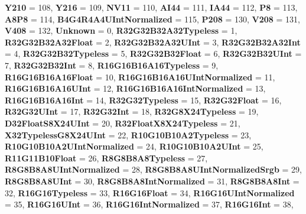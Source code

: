 \begin{DoxyCompactItemize}
{\bfseries Y210} = 108, 
{\bfseries Y216} = 109, 
\newline
{\bfseries N\+V11} = 110, 
{\bfseries A\+I44} = 111, 
{\bfseries I\+A44} = 112, 
{\bfseries P8} = 113, 
\newline
{\bfseries A8\+P8} = 114, 
{\bfseries B4\+G4\+R4\+A4\+U\+Int\+Normalized} = 115, 
{\bfseries P208} = 130, 
{\bfseries V208} = 131, 
\newline
{\bfseries V408} = 132, 
{\bfseries Unknown} = 0, 
{\bfseries R32\+G32\+B32\+A32\+Typeless} = 1, 
{\bfseries R32\+G32\+B32\+A32\+Float} = 2, 
\newline
{\bfseries R32\+G32\+B32\+A32\+U\+Int} = 3, 
{\bfseries R32\+G32\+B32\+A32\+Int} = 4, 
{\bfseries R32\+G32\+B32\+Typeless} = 5, 
{\bfseries R32\+G32\+B32\+Float} = 6, 
\newline
{\bfseries R32\+G32\+B32\+U\+Int} = 7, 
{\bfseries R32\+G32\+B32\+Int} = 8, 
{\bfseries R16\+G16\+B16\+A16\+Typeless} = 9, 
{\bfseries R16\+G16\+B16\+A16\+Float} = 10, 
\newline
{\bfseries R16\+G16\+B16\+A16\+U\+Int\+Normalized} = 11, 
{\bfseries R16\+G16\+B16\+A16\+U\+Int} = 12, 
{\bfseries R16\+G16\+B16\+A16\+Int\+Normalized} = 13, 
{\bfseries R16\+G16\+B16\+A16\+Int} = 14, 
\newline
{\bfseries R32\+G32\+Typeless} = 15, 
{\bfseries R32\+G32\+Float} = 16, 
{\bfseries R32\+G32\+U\+Int} = 17, 
{\bfseries R32\+G32\+Int} = 18, 
\newline
{\bfseries R32\+G8\+X24\+Typeless} = 19, 
{\bfseries D32\+Float\+S8\+X24\+U\+Int} = 20, 
{\bfseries R32\+Float\+X8\+X24\+Typeless} = 21, 
{\bfseries X32\+Typeless\+G8\+X24\+U\+Int} = 22, 
\newline
{\bfseries R10\+G10\+B10\+A2\+Typeless} = 23, 
{\bfseries R10\+G10\+B10\+A2\+U\+Int\+Normalized} = 24, 
{\bfseries R10\+G10\+B10\+A2\+U\+Int} = 25, 
{\bfseries R11\+G11\+B10\+Float} = 26, 
\newline
{\bfseries R8\+G8\+B8\+A8\+Typeless} = 27, 
{\bfseries R8\+G8\+B8\+A8\+U\+Int\+Normalized} = 28, 
{\bfseries R8\+G8\+B8\+A8\+U\+Int\+Normalized\+Srgb} = 29, 
{\bfseries R8\+G8\+B8\+A8\+U\+Int} = 30, 
\newline
{\bfseries R8\+G8\+B8\+A8\+Int\+Normalized} = 31, 
{\bfseries R8\+G8\+B8\+A8\+Int} = 32, 
{\bfseries R16\+G16\+Typeless} = 33, 
{\bfseries R16\+G16\+Float} = 34, 
\newline
{\bfseries R16\+G16\+U\+Int\+Normalized} = 35, 
{\bfseries R16\+G16\+U\+Int} = 36, 
{\bfseries R16\+G16\+Int\+Normalized} = 37, 
{\bfseries R16\+G16\+Int} = 38, 
\newline

\end{DoxyCompactItemize}
